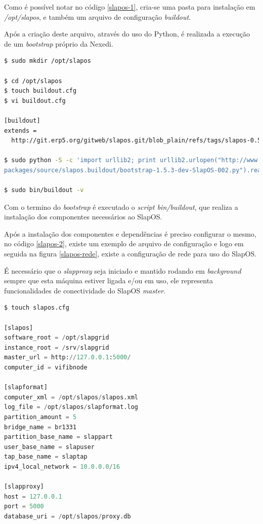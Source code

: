 Como é possível notar no código \ref{slapos-1}, cria-se uma pasta para instalação em \textit{/opt/slapos}, e também um arquivo de configuração \textit{buildout}.

Após a criação deste arquivo, através do uso do Python, é realizada a execução de um \textit{bootstrap} próprio da Nexedi.

{\singlespace
\begin{lstlisting}[caption=Primeira parte da instalação do SlapOS,language=bash,label={slapos-1}]
$ sudo mkdir /opt/slapos 

$ cd /opt/slapos
$ touch buildout.cfg
$ vi buildout.cfg

[buildout]
extends =
  http://git.erp5.org/gitweb/slapos.git/blob_plain/refs/tags/slapos-0.57:/component/slapos/buildout.cfg

$ sudo python -S -c 'import urllib2; print urllib2.urlopen("http://www.nexedi.org/static/\
packages/source/slapos.buildout/bootstrap-1.5.3-dev-SlapOS-002.py").read()' | python -S -

$ sudo bin/buildout -v
\end{lstlisting}
}

Com o termino do \textit{bootstrap} é executado o \textit{script bin/buildout}, que realiza a instalação dos componentes necessários ao SlapOS.


Após a instalação dos componentes e dependências é preciso configurar o mesmo, no código \ref{slapos-2}, existe um exemplo de arquivo de configuração e logo em seguida na figura \ref{slapos-rede}, existe a configuração de rede para uso do SlapOS.

É necessário que o \textit{slapproxy} seja iniciado e mantido rodando em \textit{background} sempre que esta máquina estiver ligada e/ou em uso, ele representa funcionalidades de conectividade do SlapOS \textit{master}.

{\singlespace
\begin{lstlisting}[caption=Arquivo de configuração do SlapOS,language=python,label={slapos-2}]
$ touch slapos.cfg

[slapos]
software_root = /opt/slapgrid
instance_root = /srv/slapgrid
master_url = http://127.0.0.1:5000/
computer_id = vifibnode

[slapformat]
computer_xml = /opt/slapos/slapos.xml
log_file = /opt/slapos/slapformat.log
partition_amount = 5
bridge_name = br1331
partition_base_name = slappart
user_base_name = slapuser
tap_base_name = slaptap
ipv4_local_network = 10.0.0.0/16

[slapproxy]
host = 127.0.0.1
port = 5000
database_uri = /opt/slapos/proxy.db

\end{lstlisting}
}

